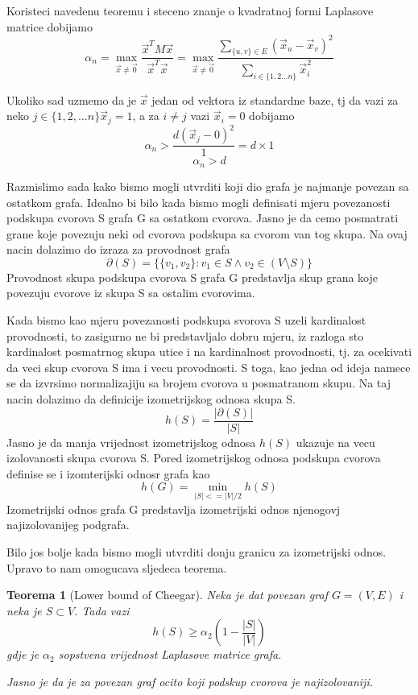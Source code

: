 \documentclass[11pt]{article}
\newtheorem{theorem}{Teorema}
\begin{document}
    Koristeci navedenu teoremu i steceno znanje o kvadratnoj formi Laplasove matrice dobijamo
    \[
        \alpha_n = \max_{\vec{x} \neq \vec{0}} \frac{\vec{x}^T M \vec{x}}{\vec{x}^T\vec{x}} = \max_{\vec{x} \neq \vec{0}} \frac{ \sum_{\{u,v\} \in E} (\vec{x}_u - \vec{x}_v)^2 }{ \sum_{i \in \{1,2 \dots n\}} \vec{x}_i^2}
    \]
        
    Ukoliko sad uzmemo da je $\vec{x}$ jedan od vektora iz standardne baze, tj da vazi za neko $j \in \{1,2, \dots n\} \vec{x}_j = 1$, a za $i \neq j$ vazi $\vec{x}_i = 0$ dobijamo
    \[
        \alpha_n > \frac{ d (\vec{x}_j - 0)^2 }{1} = d \times 1  
    \]
    \[
        \alpha_n > d  
    \]

    Razmislimo sada kako bismo mogli utvrditi koji dio grafa je najmanje povezan sa ostatkom grafa. Idealno bi bilo kada bismo mogli definisati mjeru povezanosti podskupa cvorova S grafa G sa ostatkom cvorova.
    Jasno je da cemo posmatrati grane koje povezuju neki od cvorova podskupa sa cvorom van tog skupa. Na ovaj nacin dolazimo do izraza za provodnost grafa
    \[ \partial(S) = \{ \{v_1,v_2\}: v_1 \in S \land v_2 \in (V \setminus S)\} \]
    Provodnost skupa podskupa cvorova S grafa G predstavlja skup grana koje povezuju cvorove iz skupa S sa ostalim cvorovima.


    Kada bismo kao mjeru povezanosti podskupa svorova S uzeli kardinalost provodnosti, to zasigurno ne bi predstavljalo dobru mjeru, iz razloga sto kardinalost
    posmatrnog skupa utice i na kardinalnost provodnosti, tj. za ocekivati da veci skup cvorova S ima i vecu provodnosti. S toga, kao jedna od ideja namece se da izvrsimo normalizajiju sa brojem 
    cvorova u posmatranom skupu. Na taj nacin dolazimo da definicije izometrijskog odnosa skupa S.
    \[
        h(S) = \frac{|\partial(S)|}{|S|}
    \]
    Jasno je da manja vrijednost izometrijskog odnosa $h(S)$ ukazuje na vecu izolovanosti skupa cvorova S.
    Pored izometrijskog odnosa podskupa cvorova definise se i izomterijski odnosr grafa kao
    \[
         h(G) = \min_{|S| <= |V| / 2} h(S)
    \]
    Izometrijski odnos grafa G predstavlja izometrijski odnos njenogovj najizolovanijeg podgrafa.
    
    Bilo jos bolje kada bismo mogli utvrditi donju granicu za izometrijski odnos. Upravo to nam omogucava sljedeca teorema.

    \begin{theorem}[Lower bound of Cheegar]
        Neka je dat povezan graf $G=(V,E)$ i neka je $S \subset V$. Tada vazi
        \[ h(S) \geq \alpha_2 (1 - \frac{|S|}{|V|})\]
        gdje je $\alpha_2$ sopstvena vrijednost Laplasove matrice grafa.

        Jasno je da je za povezan graf ocito koji podskup cvorova je najizolovaniji.
    \end{theorem}
\end{document}
